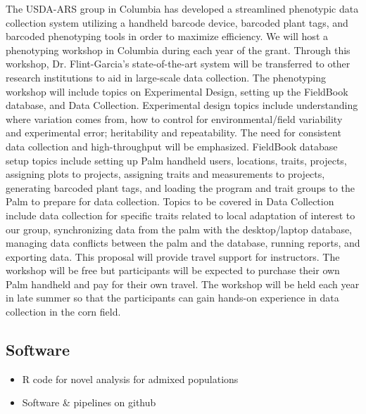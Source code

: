 The USDA-ARS group in Columbia has developed a streamlined phenotypic data collection system utilizing a handheld barcode device, barcoded plant tags, and barcoded phenotyping tools in order to maximize efficiency.  We will host a phenotyping workshop in Columbia during each year of the grant.  Through this workshop, Dr. Flint-Garcia’s state-of-the-art system will be transferred to other research institutions to aid in large-scale data collection. The phenotyping workshop will include topics on Experimental Design, setting up the FieldBook database, and Data Collection.  Experimental design topics include understanding where variation comes from, how to control for environmental/field variability and experimental error; heritability and repeatability.  The need for consistent data collection and high-throughput will be emphasized.  FieldBook database setup topics include setting up Palm handheld users, locations, traits, projects, assigning plots to projects, assigning traits and measurements to projects,  generating barcoded plant tags, and loading the program and trait groups to the Palm to prepare for data collection.  Topics to be covered in Data Collection include data collection for specific traits related to local adaptation of interest to our group, synchronizing data from the palm with the desktop/laptop database, managing data conflicts between the palm and the database, running reports, and exporting data.  This proposal will provide travel support for instructors.  The workshop will be free but participants will be expected to purchase their own Palm handheld and pay for their own travel.  The workshop will be held each year in late summer so that the participants can gain hands-on experience in data collection in the corn field.

\subsection*{Software} %
\begin{itemize}
\item R code for novel analysis for admixed populations
\item Software \& pipelines on github 
\end{itemize}



